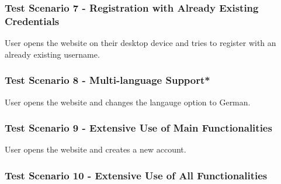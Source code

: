 \subsubsection{Test Scenario 7 - Registration with Already Existing Credentials}
User opens the website on their desktop device and tries to register with an already existing username.
\subsubsection{Test Scenario 8 - Multi-language Support*}
User opens the website and changes the langauge option to German. 
\subsubsection{Test Scenario 9 - Extensive Use of Main Functionalities} %
User opens the website and creates a new account. 
\subsubsection{Test Scenario 10 - Extensive Use of All Functionalities} %